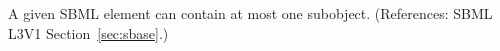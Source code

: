 A given SBML element can contain at most one \Notes subobject.
(References: SBML L3V1 Section~\ref{sec:sbase}.)

